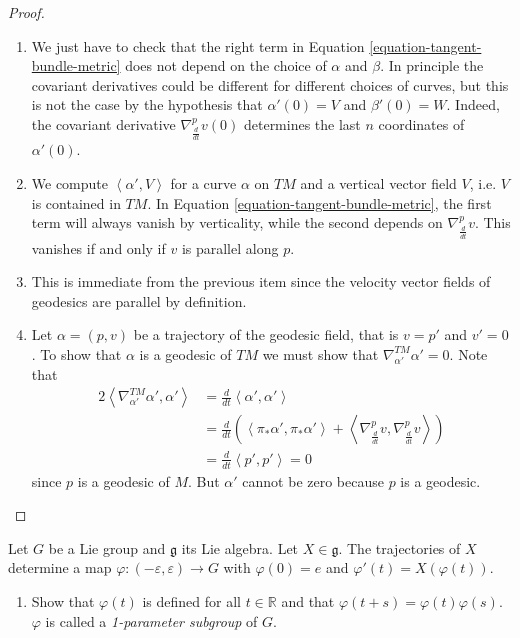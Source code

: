 \begin{proof}
\begin{enumerate}
\item We just have to check that the right term in 
Equation \ref{equation-tangent-bundle-metric}
does not depend on the choice of $\alpha$ and $\beta$.
In principle the covariant derivatives could be different
for different choices of curves, but this is not the
case by the hypothesis that $\alpha'(0)=V$ and $\beta'(0)=W$.
Indeed, the covariant derivative $\nabla_{\frac{d}{dt}}^pv(0)$
determines the last $n$ coordinates of $\alpha'(0)$.

\item We compute $\left<\alpha',V\right>$ for a curve $\alpha$ on $TM$
and a vertical vector field $V$, i.e. $V$ is contained in $TM$.
In Equation \ref{equation-tangent-bundle-metric},
the first term will always vanish by verticality,
while the second depends on $\nabla_{\frac{d}{dt}}^pv$.
This vanishes if and only if $v$ is parallel along $p$.

\item This is immediate from the previous item
since the velocity vector fields of geodesics are parallel by definition.

\item Let $\alpha=(p,v)$ be a trajectory of the geodesic field,
that is $v=p'$ and $v'=0$.
To show that $\alpha$ is a geodesic of $TM$ 
we must show that $\nabla_{\alpha'}^{TM}\alpha'=0$.
Note that
\begin{align*}
2\left<\nabla_{\alpha'}^{TM}\alpha',\alpha'\right>
&=\frac{d}{dt}\left<\alpha',\alpha'\right>\\
&=\frac{d}{dt}\left(\left<\pi_*\alpha',\pi_*\alpha'\right>
+\left<\nabla_{\frac{d}{dt}}^pv,\nabla_{\frac{d}{dt}}^pv\right>\right)\\
&=\frac{d}{dt}\left<p',p'\right>=0
\end{align*}
since $p$ is a geodesic of $M$.
But $\alpha'$ cannot be zero because $p$ is a geodesic.
\end{enumerate}
\end{proof}

\begin{exercise}
\label{exercise-lie-group-bi-invariant-metric}
Let $G$ be a Lie group and $\mathfrak{g}$ its Lie algebra.
Let $X \in \mathfrak{g}$. The trajectories of $X$
determine a map $\varphi:(-\varepsilon,\varepsilon) \to G$
with $\varphi(0)=e$ and $\varphi'(t)=X(\varphi(t))$.

\begin{enumerate}
\item Show that $\varphi(t)$ is defined for all $t \in \mathbb{R}$
and that $\varphi(t+s)=\varphi(t)\varphi(s)$.
$\varphi$ is called a {\it 1-parameter subgroup} of $G$.
\end{enumerate}
\end{exercise}

